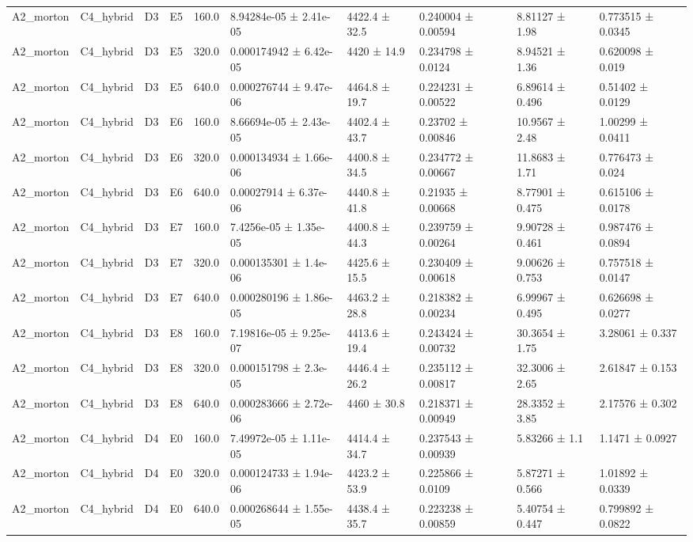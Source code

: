 \begin{table}
\begin{tabular}{llllllllll}
A2\_morton & C4\_hybrid & D3 & E5 & 160.0 & 8.94284e-05 ± 2.41e-05 & 4422.4 ± 32.5 & 0.240004 ± 0.00594 & 8.81127 ± 1.98 & 0.773515 ± 0.0345 \\
A2\_morton & C4\_hybrid & D3 & E5 & 320.0 & 0.000174942 ± 6.42e-05 & 4420 ± 14.9 & 0.234798 ± 0.0124 & 8.94521 ± 1.36 & 0.620098 ± 0.019 \\
A2\_morton & C4\_hybrid & D3 & E5 & 640.0 & 0.000276744 ± 9.47e-06 & 4464.8 ± 19.7 & 0.224231 ± 0.00522 & 6.89614 ± 0.496 & 0.51402 ± 0.0129 \\
A2\_morton & C4\_hybrid & D3 & E6 & 160.0 & 8.66694e-05 ± 2.43e-05 & 4402.4 ± 43.7 & 0.23702 ± 0.00846 & 10.9567 ± 2.48 & 1.00299 ± 0.0411 \\
A2\_morton & C4\_hybrid & D3 & E6 & 320.0 & 0.000134934 ± 1.66e-06 & 4400.8 ± 34.5 & 0.234772 ± 0.00667 & 11.8683 ± 1.71 & 0.776473 ± 0.024 \\
A2\_morton & C4\_hybrid & D3 & E6 & 640.0 & 0.00027914 ± 6.37e-06 & 4440.8 ± 41.8 & 0.21935 ± 0.00668 & 8.77901 ± 0.475 & 0.615106 ± 0.0178 \\
A2\_morton & C4\_hybrid & D3 & E7 & 160.0 & 7.4256e-05 ± 1.35e-05 & 4400.8 ± 44.3 & 0.239759 ± 0.00264 & 9.90728 ± 0.461 & 0.987476 ± 0.0894 \\
A2\_morton & C4\_hybrid & D3 & E7 & 320.0 & 0.000135301 ± 1.4e-06 & 4425.6 ± 15.5 & 0.230409 ± 0.00618 & 9.00626 ± 0.753 & 0.757518 ± 0.0147 \\
A2\_morton & C4\_hybrid & D3 & E7 & 640.0 & 0.000280196 ± 1.86e-05 & 4463.2 ± 28.8 & 0.218382 ± 0.00234 & 6.99967 ± 0.495 & 0.626698 ± 0.0277 \\
A2\_morton & C4\_hybrid & D3 & E8 & 160.0 & 7.19816e-05 ± 9.25e-07 & 4413.6 ± 19.4 & 0.243424 ± 0.00732 & 30.3654 ± 1.75 & 3.28061 ± 0.337 \\
A2\_morton & C4\_hybrid & D3 & E8 & 320.0 & 0.000151798 ± 2.3e-05 & 4446.4 ± 26.2 & 0.235112 ± 0.00817 & 32.3006 ± 2.65 & 2.61847 ± 0.153 \\
A2\_morton & C4\_hybrid & D3 & E8 & 640.0 & 0.000283666 ± 2.72e-06 & 4460 ± 30.8 & 0.218371 ± 0.00949 & 28.3352 ± 3.85 & 2.17576 ± 0.302 \\
A2\_morton & C4\_hybrid & D4 & E0 & 160.0 & 7.49972e-05 ± 1.11e-05 & 4414.4 ± 34.7 & 0.237543 ± 0.00939 & 5.83266 ± 1.1 & 1.1471 ± 0.0927 \\
A2\_morton & C4\_hybrid & D4 & E0 & 320.0 & 0.000124733 ± 1.94e-06 & 4423.2 ± 53.9 & 0.225866 ± 0.0109 & 5.87271 ± 0.566 & 1.01892 ± 0.0339 \\
A2\_morton & C4\_hybrid & D4 & E0 & 640.0 & 0.000268644 ± 1.55e-05 & 4438.4 ± 35.7 & 0.223238 ± 0.00859 & 5.40754 ± 0.447 & 0.799892 ± 0.0822 \\

\end{tabular}
\end{table}
